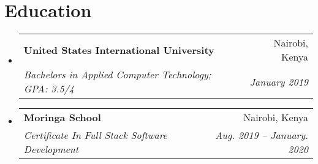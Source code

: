 \documentclass[letterpaper,11pt]{article}
\makeatletter
\newcommand{\resumeSubheading}[4]{
  \vspace{-1pt}\item
    \begin{tabular*}{0.97\textwidth}{l@{\extracolsep{\fill}}r}
      \textbf{#1} & #2 \\
      \textit{\small#3} & \textit{\small #4} \\
    \end{tabular*}\vspace{-5pt}
}
\newcommand{\resumeSubHeadingListStart}{\begin{itemize}[leftmargin=*]}
\newcommand{\resumeSubHeadingListEnd}{\end{itemize}}
\makeatother
\begin{document}


\section{Education}
  \resumeSubHeadingListStart
    \resumeSubheading
      {United States International University}{Nairobi, Kenya}
      {Bachelors in Applied Computer Technology;  GPA: 3.5/4}{January 2019}
    \resumeSubheading
      {Moringa School}{Nairobi, Kenya}
      {Certificate In Full Stack Software Development}{Aug. 2019 -- January. 2020}
  \resumeSubHeadingListEnd
\end{document}

